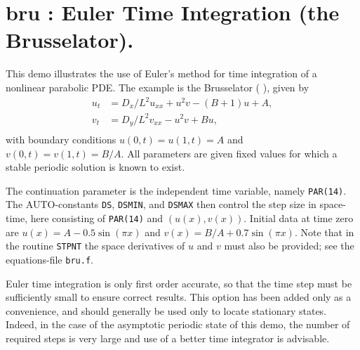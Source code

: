 \documentclass[12pt]{report}
\begin{document}
\newpage
\section{ bru : Euler Time Integration (the Brusselator).} \label{sec:Demos_bru}
This demo illustrates the use of Euler's method for time integration
of a nonlinear parabolic PDE.
The example is the Brusselator
( \citeyear{HoKnKu:87}), given by
\begin{equation} \begin{array}{cl}
  u_t &= {D_x / L^2} u_{xx} + u^2v - (B+1)u + A,  \\
  v_t &= {D_y / L^2} v_{xx} - u^2v + Bu,  \\
\end{array} \end{equation}
with boundary conditions $u(0,t)=u(1,t)=A$
and $v(0,t)=v(1,t)=B/A$. All parameters are given fixed values
for which a stable periodic solution is known to exist.

The continuation parameter is the independent time variable,
namely {\tt PAR(14)}.
The {\cal AUTO}-constants {\tt DS}, {\tt DSMIN}, and {\tt DSMAX}
then control the step size
in space-time, here consisting of {\tt PAR(14)} and $(u(x),v(x))$.
Initial data at time zero are 
$u(x)=A - 0.5 \sin(\pi x)$ and 
$v(x)=B/A + 0.7 \sin(\pi x)$.
Note that in the routine {\tt STPNT} the space derivatives of $u$ and $v$
must also be provided; 
see the equations-file {\tt bru.f}.

Euler time integration is only first order accurate, so that
the time step must be sufficiently small to ensure correct results.
This option has been added only as a convenience, and should 
generally be used only to locate stationary states.
Indeed, in the case of the asymptotic periodic state of this demo,
the number of required steps is very large and use of a better time 
integrator is advisable.
\end{document}
